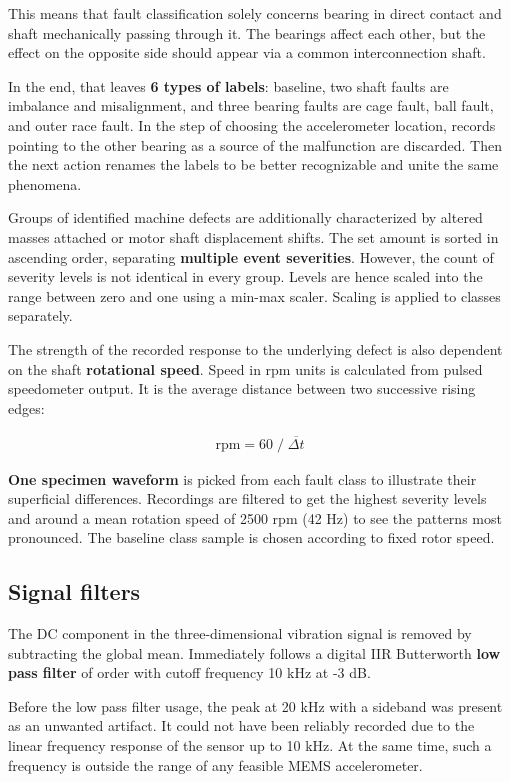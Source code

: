 This means that fault classification solely concerns bearing in direct contact and shaft mechanically passing through it. The bearings affect each other, but the effect on the opposite side should appear via a common interconnection shaft. 

In the end, that leaves \textbf{6 types of labels}: baseline, two shaft faults are imbalance and misalignment, and three bearing faults are cage fault, ball fault, and outer race fault. In the step of choosing the accelerometer location, records pointing to the other bearing as a source of the malfunction are discarded. Then the next action renames the labels to be better recognizable and unite the same phenomena.

Groups of identified machine defects are additionally characterized by altered masses attached or motor shaft displacement shifts. The set amount is sorted in ascending order, separating \textbf{multiple event severities}. However, the count of severity levels is not identical in every group. Levels are hence scaled into the range between zero and one using a min-max scaler. Scaling is applied to classes separately.

The strength of the recorded response to the underlying defect is also dependent on the shaft \textbf{rotational speed}. Speed in rpm units is calculated from pulsed speedometer output. It is the average distance between two successive rising edges: 
\begin{ceqn}\begin{align}
\mathrm{rpm} = 60 \;/\; \overline{\Delta t}
\end{align}\end{ceqn}

\textbf{One specimen waveform} is picked from each fault class to illustrate their superficial differences. Recordings are filtered to get the highest severity levels and around a mean rotation speed of 2500 rpm (42 Hz) to see the patterns most pronounced. The baseline class sample is chosen according to fixed rotor speed.

\subsection{Signal filters}
The DC component in the three-dimensional vibration signal is removed by subtracting the global mean. Immediately follows a digital IIR Butterworth \textbf{low pass filter} of  order with cutoff frequency 10 kHz at -3 dB. 

Before the low pass filter usage, the peak at 20 kHz with a sideband was present as an unwanted artifact. It could not have been reliably recorded due to the linear frequency response of the sensor up to 10 kHz. At the same time, such a frequency is outside the range of any feasible MEMS accelerometer.


